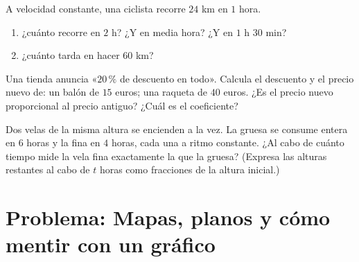 \begin{exercise}[$\star\star$]\label{exo:g6:propdata:10}
A velocidad constante, una ciclista recorre $24$ km en $1$ hora.
\begin{enumerate}
  \item ¿cuánto recorre en $2$ h? ¿Y en media hora? ¿Y en
        $1$ h $30$ min?
  \item ¿cuánto tarda en hacer $60$ km?
\end{enumerate}
\end{exercise}

\begin{exercise}[$\star\star$]\label{exo:g6:propdata:11}
Una tienda anuncia «$20\,\%$ de descuento en todo». Calcula el descuento y
el precio nuevo de: un balón de $15$ euros; una raqueta de $40$ euros. ¿Es el
precio nuevo proporcional al precio antiguo? ¿Cuál es el coeficiente?
\end{exercise}

\begin{exercise}[$\star\star\star$]\label{exo:g6:propdata:12}
Dos velas de la misma altura se encienden a la vez. La gruesa
se consume entera en $6$ horas y la fina en $4$ horas, cada una a
ritmo constante. ¿Al cabo de cuánto tiempo mide la vela fina exactamente la
 que la gruesa? (Expresa las alturas restantes al cabo de
$t$ horas como fracciones de la altura inicial.)
\end{exercise}

\section{Problema: Mapas, planos y cómo mentir con un gráfico}

